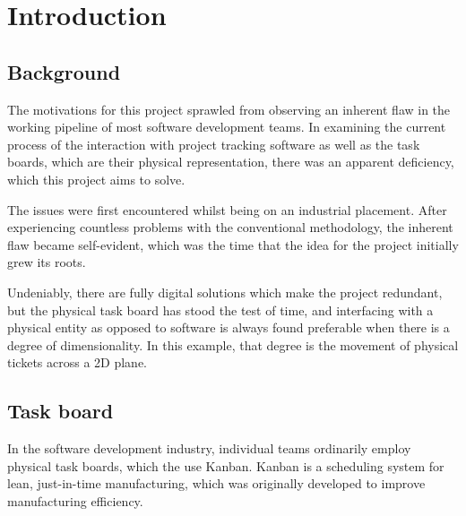 \documentclass[12pt]{report}
\theoremstyle{definition}
\theoremstyle{remark}
\begin{document}



\newpage
\chapter{Introduction}
\section{Background}

The motivations for this project sprawled from observing an inherent flaw in the working pipeline of most software development teams. In examining the current process of the interaction with project tracking software as well as the task boards, which are their physical representation, there was an apparent deficiency, which this project aims to solve.

The issues were first encountered whilst being on an industrial placement. After experiencing countless problems with the conventional methodology, the inherent flaw became self-evident, which was the time that the idea for the project initially grew its roots.

Undeniably, there are fully digital solutions which make the project redundant, but the physical task board has stood the test of time, and interfacing with a physical entity as opposed to software is always found preferable when there is a degree of dimensionality. In this example, that degree is the movement of physical tickets across a 2D plane.

\section{Task board}
In the software development industry, individual teams ordinarily employ physical task boards, which the use Kanban. Kanban is a scheduling system for lean, just-in-time manufacturing, which was originally developed to improve manufacturing efficiency. 
\end{document}
